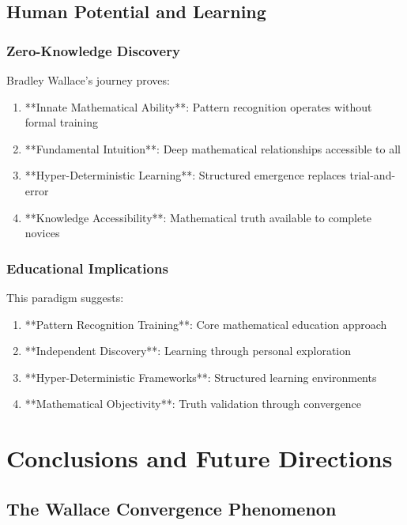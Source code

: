\documentclass[12pt]{article}
\begin{document}
\subsection{Human Potential and Learning}

\subsubsection{Zero-Knowledge Discovery}

Bradley Wallace's journey proves:

\begin{enumerate}
    \item **Innate Mathematical Ability**: Pattern recognition operates without formal training
    \item **Fundamental Intuition**: Deep mathematical relationships accessible to all
    \item **Hyper-Deterministic Learning**: Structured emergence replaces trial-and-error
    \item **Knowledge Accessibility**: Mathematical truth available to complete novices
\end{enumerate}

\subsubsection{Educational Implications}

This paradigm suggests:

\begin{enumerate}
    \item **Pattern Recognition Training**: Core mathematical education approach
    \item **Independent Discovery**: Learning through personal exploration
    \item **Hyper-Deterministic Frameworks**: Structured learning environments
    \item **Mathematical Objectivity**: Truth validation through convergence
\end{enumerate}

\section{Conclusions and Future Directions}

\subsection{The Wallace Convergence Phenomenon}
\end{document}
